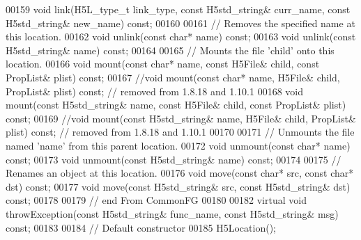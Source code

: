 \begin{DoxyCode}
00159         \textcolor{keywordtype}{void} link(H5L\_type\_t link\_type, \textcolor{keyword}{const} H5std\_string& curr\_name, \textcolor{keyword}{const} H5std\_string& new\_name) \textcolor{keyword}{const};
00160 
00161         \textcolor{comment}{// Removes the specified name at this location.}
00162         \textcolor{keywordtype}{void} unlink(\textcolor{keyword}{const} \textcolor{keywordtype}{char}* name) \textcolor{keyword}{const};
00163         \textcolor{keywordtype}{void} unlink(\textcolor{keyword}{const} H5std\_string& name) \textcolor{keyword}{const};
00164 
00165         \textcolor{comment}{// Mounts the file 'child' onto this location.}
00166         \textcolor{keywordtype}{void} mount(\textcolor{keyword}{const} \textcolor{keywordtype}{char}* name, \textcolor{keyword}{const} H5File& child, \textcolor{keyword}{const} PropList& plist) \textcolor{keyword}{const};
00167         \textcolor{comment}{//void mount(const char* name, H5File& child, PropList& plist) const; // removed from 1.8.18 and
       1.10.1}
00168         \textcolor{keywordtype}{void} mount(\textcolor{keyword}{const} H5std\_string& name, \textcolor{keyword}{const} H5File& child, \textcolor{keyword}{const} PropList& plist) \textcolor{keyword}{const};
00169         \textcolor{comment}{//void mount(const H5std\_string& name, H5File& child, PropList& plist) const; // removed from
       1.8.18 and 1.10.1}
00170 
00171         \textcolor{comment}{// Unmounts the file named 'name' from this parent location.}
00172         \textcolor{keywordtype}{void} unmount(\textcolor{keyword}{const} \textcolor{keywordtype}{char}* name) \textcolor{keyword}{const};
00173         \textcolor{keywordtype}{void} unmount(\textcolor{keyword}{const} H5std\_string& name) \textcolor{keyword}{const};
00174 
00175         \textcolor{comment}{// Renames an object at this location.}
00176         \textcolor{keywordtype}{void} move(\textcolor{keyword}{const} \textcolor{keywordtype}{char}* src, \textcolor{keyword}{const} \textcolor{keywordtype}{char}* dst) \textcolor{keyword}{const};
00177         \textcolor{keywordtype}{void} move(\textcolor{keyword}{const} H5std\_string& src, \textcolor{keyword}{const} H5std\_string& dst) \textcolor{keyword}{const};
00178 
00179 \textcolor{comment}{// end From CommonFG}
00180 
00182         \textcolor{keyword}{virtual} \textcolor{keywordtype}{void} throwException(\textcolor{keyword}{const} H5std\_string& func\_name, \textcolor{keyword}{const} H5std\_string& msg) \textcolor{keyword}{const};
00183 
00184         \textcolor{comment}{// Default constructor}
00185         H5Location();

\end{DoxyCode}
